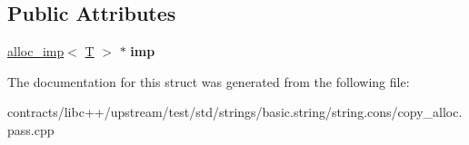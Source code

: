 \subsection*{Public Attributes}
\begin{DoxyCompactItemize}
\item 
\mbox{\label{structpoca__alloc_abc28fce106737e0d9091abc60db816db}} 
\mbox{\hyperlink{structalloc__imp}{alloc\+\_\+imp}}$<$ \mbox{\hyperlink{struct_t}{T}} $>$ $\ast$ {\bfseries imp}
\end{DoxyCompactItemize}


The documentation for this struct was generated from the following file\+:\begin{DoxyCompactItemize}
\item 
contracts/libc++/upstream/test/std/strings/basic.\+string/string.\+cons/copy\+\_\+alloc.\+pass.\+cpp\end{DoxyCompactItemize}
